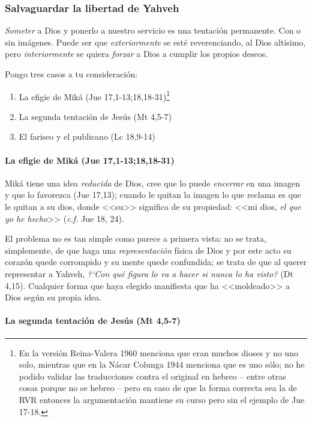 \documentclass{article}
\begin{document}
\subsubsection{Salvaguardar la libertad de Yahveh}

\emph{Someter} a Dios y ponerlo a nuestro servicio es una tentaci\'on permanente. Con o sin im\'agenes. Puede ser que \emph{exteriormente} se est\'e reverenciando, al Dios alt\'{i}simo, pero \emph{interiormente} se quiera \emph{forzar} a Dios a cumplir los propios deseos.

Pongo tres casos a tu consideraci\'on:

\begin{enumerate}
\item La efigie de Mik\'a (Jue 17,1-13;18,18-31)\footnote{En la versi\'on Reina-Valera 1960 menciona que eran muchos dioses y no uno solo, mientras que en la N\'acar Colunga 1944 menciona que es uno s\'olo; no he podido validar las traducciones contra el original en hebreo -- entre otras cosas porque no se hebreo -- pero en caso de que la forma correcta sea la de RVR entonces la argumentaci\'on mantiene su curso pero sin el ejemplo de Jue 17-18.}
\item La segunda tentaci\'on de Jes\'us (Mt 4,5-7)
\item El fariseo y el publicano (Lc 18,9-14)
\end{enumerate}

\paragraph{La efigie de Mik\'a (Jue 17,1-13;18,18-31)}

Mik\'a tiene una idea \emph{reducida} de Dios, cree que lo puede \emph{encerrar} en una imagen y que lo favorezca (Jue 17,13); cuando le quitan la imagen lo que reclama es que le quitan a su dios, donde <<su>> significa de su propiedad: <<mi dios, \emph{el que yo he hecho}>> (\emph{c.f.} Jue 18, 24).

El problema no es tan simple como parece a primera vista: no se trata, simplemente, de que haga una \emph{representaci\'on} f\'{i}sica de Dios y por este acto su coraz\'on quede corrompido y su mente quede confundida; se trata de que al querer representar a Yahveh, \emph{?`Con qu\'e figura lo va a hacer si nunca lo ha visto?} (Dt 4,15). Cualquier forma que haya elegido manifiesta que ha <<moldeado>> a Dios seg\'un su propia idea.

\paragraph{La segunda tentaci\'on de Jes\'us (Mt 4,5-7)}
\end{document}
